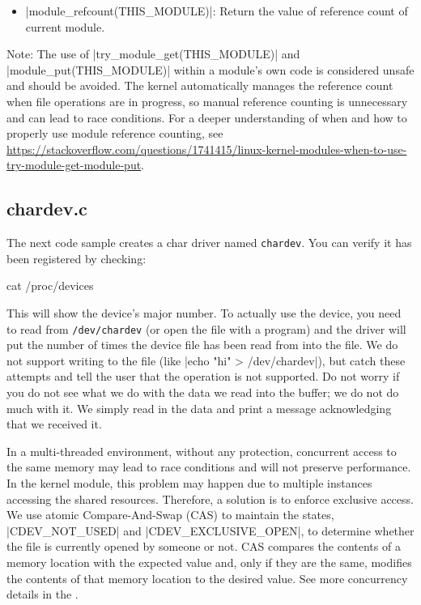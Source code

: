 \documentclass[10pt, oneside]{book}
\begin{document}
\begin{itemize}
  \item \cpp|module_refcount(THIS_MODULE)|: Return the value of reference count of current module.
\end{itemize}

Note: The use of \cpp|try_module_get(THIS_MODULE)| and \cpp|module_put(THIS_MODULE)| within a module's own code is considered unsafe and should be avoided.
The kernel automatically manages the reference count when file operations are in progress,
so manual reference counting is unnecessary and can lead to race conditions.
For a deeper understanding of when and how to properly use module reference counting,
see \url{https://stackoverflow.com/questions/1741415/linux-kernel-modules-when-to-use-try-module-get-module-put}.

\subsection{chardev.c}
\label{sec:chardev_c}
The next code sample creates a char driver named \verb|chardev|.
You can verify it has been registered by checking:

\begin{codebash}
cat /proc/devices
\end{codebash}

This will show the device's major number.
To actually use the device, you need to read from \verb|/dev/chardev| (or open the file with a program) and the driver will put the number of times the device file has been read from into the file.
We do not support writing to the file (like \sh|echo "hi" > /dev/chardev|),
but catch these attempts and tell the user that the operation is not supported.
Do not worry if you do not see what we do with the data we read into the buffer; we do not do much with it.
We simply read in the data and print a message acknowledging that we received it.

In a multi-threaded environment, without any protection, concurrent access to the same memory may lead to race conditions and will not preserve performance.
In the kernel module, this problem may happen due to multiple instances accessing the shared resources.
Therefore, a solution is to enforce exclusive access.
We use atomic Compare-And-Swap (CAS) to maintain the states, \cpp|CDEV_NOT_USED| and \cpp|CDEV_EXCLUSIVE_OPEN|, to determine whether the file is currently opened by someone or not.
CAS compares the contents of a memory location with the expected value and, only if they are the same, modifies the contents of that memory location to the desired value.
See more concurrency details in the .
\end{document}
